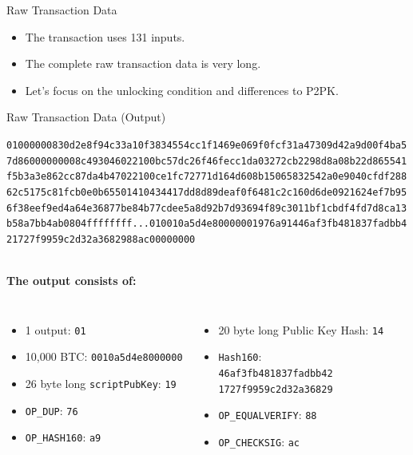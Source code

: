 \documentclass[]{beamer}
\begin{document}
\begin{frame}{Raw Transaction Data}
	\begin{itemize}
		\item The transaction uses 131 inputs.
		\item The complete raw transaction data is very long.
		\item Let's focus on the unlocking condition and differences to P2PK.
	\end{itemize}
\end{frame}

\begin{frame}{Raw Transaction Data (Output)}
\begin{scriptsize}
\texttt{\textcolor{black!30}{01000000830d2e8f94c33a10f3834554cc1f1469e069f0fcf31a47309d42a9d00f4ba5
7d86000000008c493046022100bc57dc26f46fecc1da03272cb2298d8a08b22d865541
f5b3a3e862cc87da4b47022100ce1fc72771d164d608b15065832542a0e9040cfdf288
62c5175c81fcb0e0b65501410434417dd8d89deaf0f6481c2c160d6de0921624ef7b95
6f38eef9ed4a64e36877be84b77cdee5a8d92b7d93694f89c3011bf1cbdf4fd7d8ca13
b58a7bb4ab0804ffffffff}\alert<1>{...}{\alert<2>{01}\alert<3>{0010a5d4e8000000}\alert<4>{19}\alert<5>{76}\alert<6>{a9}\alert<7>{14}\alert<8>{46af3fb481837fadbb4
21727f9959c2d32a36829}\alert<9>{88}\alert<10>{ac}}\textcolor{black!30}{00000000}}
\end{scriptsize}
\vspace{1em}
	\scriptsize \\
	\textbf{The output consists of:}\\
	\begin{columns}
	\begin{itemize}
		\item \alert<2>{1 output: \texttt{01}}
		\item \alert<3>{10,000 BTC: \texttt{0010a5d4e8000000}}
		\item \alert<4>{26 byte long \texttt{scriptPubKey}: \texttt{19}}
		\item \textcolor{black!50}{\alert<5>{\texttt{OP\_DUP}: \texttt{76}}}
		\item \textcolor{black!50}{\alert<6>{\texttt{OP\_HASH160}: \texttt{a9}}}
	\end{itemize}
	\begin{itemize}
		\item \alert<7>{20 byte long Public Key Hash: \texttt{14}}
		\item \alert<8>{\texttt{Hash160}:\\
		\texttt{46af3fb481837fadbb42\\1727f9959c2d32a36829}}
		\item \textcolor{black!50}{\alert<9>{\texttt{OP\_EQUALVERIFY}: \texttt{88}}}
		\item \textcolor{black!50}{\alert<10>{\texttt{OP\_CHECKSIG}: \texttt{ac}}}
	\end{itemize}
	\end{columns}
	\vspace{1em}
	\normalsize
	\\
\end{frame}
\end{document}
